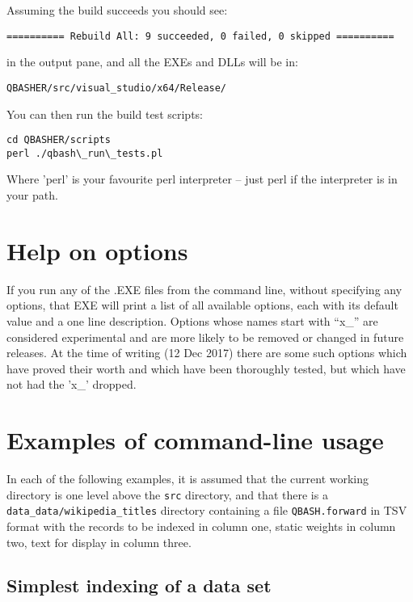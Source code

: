 \documentclass{article}
\begin{document}
\noindent Assuming the build succeeds you should see:

\begin{verbatim}
========== Rebuild All: 9 succeeded, 0 failed, 0 skipped ==========
\end{verbatim}

\noindent in the output pane, and all the EXEs and DLLs will be in:

\begin{verbatim}
QBASHER/src/visual_studio/x64/Release/
\end{verbatim}

\noindent You can then run the build test scripts:
\begin{verbatim}
cd QBASHER/scripts    
perl ./qbash\_run\_tests.pl   
\end{verbatim}

Where 'perl' is your favourite perl interpreter -- just perl if the
interpreter is in your path.

\section{Help on options}
If you run any of the .EXE files from the command line, without
specifying any options, that EXE will print a list of all available
options, each with its default value and a one line description.
Options whose names start with ``x\_'' are considered experimental and
are more likely to be removed or changed in future releases.    At the
time of writing (12 Dec 2017) there are some such options which have
proved their worth and which have been thoroughly tested, but which
have not had the 'x\_' dropped.


\section{Examples of command-line usage}

In each of the following examples, it is assumed that the current
working directory is one level above the \texttt{src} directory, and
that there is a \texttt{data\_data/wikipedia\_titles} directory containing a file
\texttt{QBASH.forward} in TSV format with the records to be
indexed in column one, static weights in column two, text for display
in column three.


\subsection{Simplest indexing of a data set}
\end{document}
